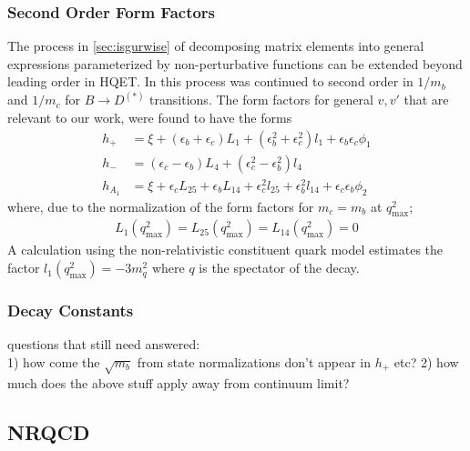 \subsubsection{Second Order Form Factors}

The process in \ref{sec:isgurwise} of decomposing matrix elements into general expressions parameterized by non-perturbative functions can be extended beyond leading order in HQET. In \cite{Falk:1992wt} this process was continued to second order in $1/m_b$ and $1/m_c$ for $B\to D^{(*)}$ transitions. The form factors for general $v,v'$ that are relevant to our work, were found to have the forms
\begin{align}
	h_+ &= \xi + (\epsilon_b + \epsilon_c ) L_1 + ( \epsilon_b^2 + \epsilon_c^2 ) l_1 + \epsilon_b \epsilon_c \phi_1 \\
	h_- &= ( \epsilon_c - \epsilon_b )L_4 + (\epsilon_c^2-\epsilon_b^2) l_4\\
	h_{A_1} &= \xi + \epsilon_c  L_{25} + \epsilon_b L_{14} + \epsilon_c^2 l_{25} + \epsilon_b^2 l_{14} + \epsilon_c\epsilon_b \phi_2
\end{align}
where, due to the normalization of the form factors for $m_c=m_b$ at $q^2_{\text{max}}$;
\begin{align}
L_1(q^2_{\text{max}}) = L_{25}(q^2_{\text{max}}) = L_{14}(q^2_{\text{max}}) = 0
\end{align}
A calculation using the non-relativistic constituent quark model \cite{PhysRevD.39.799} estimates the factor $l_1(q^2_{\text{max}}) = -3m_q^2$ where $q$ is the spectator of the decay.

\subsubsection{Decay Constants}

{\color{red}questions that still need answered: \\ 
1) how come the $\sqrt{m_b}$ from state normalizations don't appear in $h_+$ etc?
2) how much does the above stuff apply away from continuum limit? }

\subsection{NRQCD}


